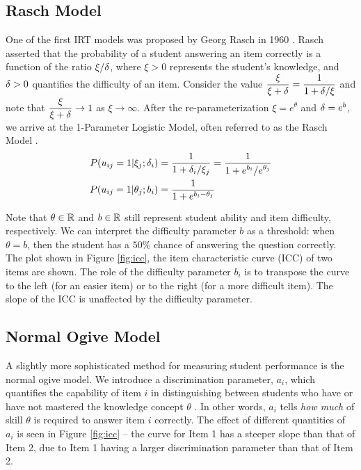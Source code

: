 \subsection{Rasch Model}
One of the first IRT models was proposed by Georg Rasch in 1960 \cite{rasch1960}. Rasch asserted that the probability of a student answering an item correctly is a function of the ratio $\xi / \delta$, where $\xi > 0$ represents the student's knowledge, and $\delta > 0$ quantifies the difficulty of an item. Consider the value $\displaystyle \frac{\xi}{\xi + \delta} = \frac{1}{1 + \delta / \xi}$ and note that $\displaystyle \frac{\xi}{\xi + \delta} \to 1$ as $\xi \to \infty$. After the re-parameterization $\xi = e^{\theta}$ and $\delta = e^{b}$, we arrive at the 1-Parameter Logistic Model, often referred to as the Rasch Model \cite{thissen}.
\begin{equation}
  \begin{split}
    P(u_{ij} = 1 | \xi_j; \delta_i) &= \frac{1}{1 + \displaystyle \delta_i/\xi_j} = \frac{1}{1 + \displaystyle e^{b_i}/e^{\theta_j}} \\
  P(u_{ij} = 1 | \theta_j; b_i) &= \frac{1}{1 + e^{b_i - \theta_j}} 
  \end{split}
  \label{eq:rasch}
\end{equation}

Note that $\theta \in \mathbb{R}$ and $b \in \mathbb{R}$ still represent student ability and item difficulty, respectively. We can interpret the difficulty parameter $b$ as a threshold: when $\theta = b$, then the student has a $50\%$ chance of answering the question correctly. The plot shown in Figure \ref{fig:icc}, the item characteristic curve (ICC) of two items are shown. The role of the difficulty parameter $b_i$ is to transpose the curve to the left (for an easier item) or to the right (for a more difficult item). The slope of the ICC is unaffected by the difficulty parameter.


\subsection{Normal Ogive Model}\label{sec:ogive}
A slightly more sophisticated method for measuring student performance is the normal ogive model. We introduce a discrimination parameter, $a_i$, which quantifies the capability of item $i$ in distinguishing between students who have or have not mastered the knowledge concept $\theta$ \cite{thissen}. In other words, $a_i$ tells \textit{how much} of skill $\theta$ is required to answer item $i$ correctly. The effect of different quantities of $a_i$ is seen in Figure \ref{fig:icc} -- the curve for Item 1 has a steeper slope than that of Item 2, due to Item 1 having a larger discrimination parameter than that of Item 2.

